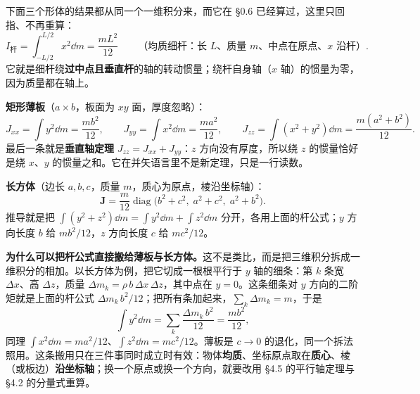 \documentclass[11pt]{ctexart}
\newcommand{\ten}[1]{\mathbf{#1}}
\let\origsubhdr\subhdr
\renewcommand{\subhdr}[1]{\par\needspace{3\baselineskip}\origsubhdr{#1}}
\begin{document}
\label{subsec:standard}

下面三个形体的结果都从同一个一维积分来，而它在 \S0.6 已经算过，这里只回指、不再重算：
\[
I_{\text{杆}}=\int_{-L/2}^{L/2}x^2\dd m=\frac{mL^2}{12}
\qquad\text{（均质细杆：长 $L$、质量 $m$、中点在原点、$x$ 沿杆）}.
\]
它就是细杆绕\textbf{过中点且垂直杆}的轴的转动惯量；绕杆自身轴（$x$ 轴）的惯量为零，因为质量都在轴上。

\textbf{矩形薄板}（$a\times b$，板面为 $xy$ 面，厚度忽略）：
\[
J_{xx}=\int y^2\dd m=\frac{mb^2}{12},\qquad
J_{yy}=\int x^2\dd m=\frac{ma^2}{12},\qquad
J_{zz}=\int(x^2+y^2)\dd m=\frac{m(a^2+b^2)}{12}.
\]
最后一条就是\textbf{垂直轴定理} $J_{zz}=J_{xx}+J_{yy}$：$z$ 方向没有厚度，所以绕 $z$ 的惯量恰好是绕 $x$、$y$ 的惯量之和。它在并矢语言里不是新定理，只是一行读数。

\textbf{长方体}（边长 $a,b,c$，质量 $m$，质心为原点，棱沿坐标轴）：
\[
\ten J=\frac{m}{12}\operatorname{diag}\bigl(b^2+c^2,\;a^2+c^2,\;a^2+b^2\bigr).
\]
推导就是把 $\int(y^2+z^2)\dd m=\int y^2\dd m+\int z^2\dd m$ 分开，各用上面的杆公式；$y$ 方向长度 $b$ 给 $mb^2/12$，$z$ 方向长度 $c$ 给 $mc^2/12$。

\textbf{为什么可以把杆公式直接搬给薄板与长方体。}这不是类比，而是把三维积分拆成一维积分的相加。以长方体为例，把它切成一根根平行于 $y$ 轴的细条：第 $k$ 条宽 $\Delta x$、高 $\Delta z$，质量 $\Delta m_k=\rho\,b\,\Delta x\,\Delta z$，其中点在 $y=0$。这条细条对 $y$ 方向的二阶矩就是上面的杆公式 $\Delta m_k\,b^2/12$；把所有条加起来，$\sum_k\Delta m_k=m$，于是
\[
\int y^2\dd m=\sum_k\frac{\Delta m_k\,b^2}{12}=\frac{mb^2}{12},
\]
同理 $\int x^2\dd m=ma^2/12$、$\int z^2\dd m=mc^2/12$。薄板是 $c\to0$ 的退化，同一个拆法照用。这条搬用只在三件事同时成立时有效：物体\textbf{均质}、坐标原点取在\textbf{质心}、棱（或板边）\textbf{沿坐标轴}；换一个原点或换一个方向，就要改用 \S4.5 的平行轴定理与 \S4.2 的分量式重算。
\end{document}
